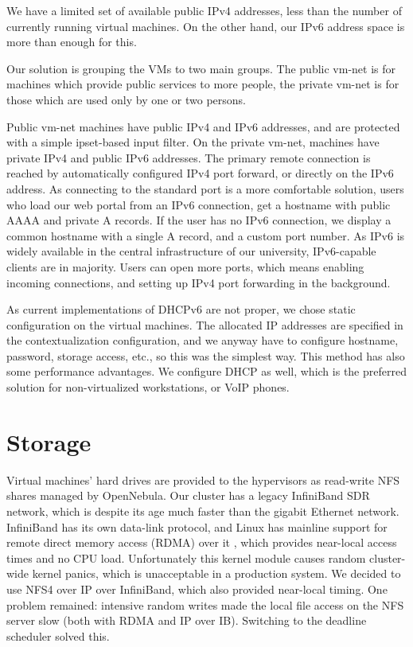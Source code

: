\documentclass{llncs}
\begin{document}
We have a limited set of available public IPv4 addresses, less than the number of currently running virtual machines. On the other hand, our IPv6 address space is more than enough for this.

Our solution is grouping the VMs to two main groups. The public vm-net is for machines which provide public services to more people, the private vm-net is for those which are used only by one or two persons.

Public vm-net machines have public IPv4 and IPv6 addresses, and are protected with a simple ipset-based input filter. On the private vm-net, machines have private IPv4 and public IPv6 addresses. The primary remote connection is reached by automatically configured IPv4 port forward, or directly on the IPv6 address. As connecting to the standard port is a more comfortable solution, users who load our web portal from an IPv6 connection, get a hostname with public AAAA and private A records. If the user has no IPv6 connection, we display a common hostname with a single A record, and a custom port number. As IPv6 is widely available in the central infrastructure of our university, IPv6-capable clients are in majority. Users can open more ports, which means enabling incoming connections, and setting up IPv4 port forwarding in the background.

As current implementations of DHCPv6 are not proper, we chose static configuration on the virtual machines. The allocated IP addresses are specified in the contextualization configuration, and we anyway have to configure hostname, password, storage access, etc., so this was the simplest way. This method has also some performance advantages. We configure DHCP as well, which is the preferred solution for non-virtualized workstations, or VoIP phones.
\section{Storage}
Virtual machines' hard drives are provided to the hypervisors as read-write NFS shares managed by OpenNebula. Our cluster has a legacy InfiniBand SDR network, which is despite its age much faster than the gigabit Ethernet network. InfiniBand has its own data-link protocol, and Linux has mainline support for remote direct memory access (RDMA) over it , which provides near-local access times and no CPU load.\cite{callaghan2002nfs} Unfortunately this kernel module causes random cluster-wide kernel panics, which is unacceptable in a production system. We decided to use NFS4 over IP over InfiniBand, which also provided near-local timing. One problem remained: intensive random writes made the local file access on the NFS server slow (both with RDMA and IP over IB). Switching to the deadline scheduler solved this.
\end{document}
